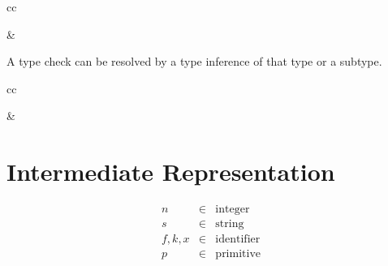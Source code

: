 \documentclass[11pt]{article}
\newcommand{\kw}[1]{\mathtt{#1}}
\begin{document}
\begin{rules}{cc}


&


\end{rules}

A type check can be resolved by a type inference of that type or a subtype.

\begin{rules}{cc}


&


\end{rules}

\newpage

\section{Intermediate Representation}

\newcommand{\appc}[2]{#1\;#2}
\newcommand{\appf}[3]{#1\;#2\;#3}
\newcommand{\letc}[4]{\kw{letc}\;#1\;#2 = #3\;\kw{in}\;#4}

\newcommand{\defterm}[4]{#1\;#2\;#3 = #4}
\newcommand{\letf}[2]{\kw{letf}\;\repo{#1}\;\kw{in}\;#2}
\newcommand{\letff}[2]{\kw{letf}\;#1\;\kw{in}\;#2}

\newcommand{\letv}[3]{\kw{letv}\;#1 = #2\;\kw{in}\;#3}

\newcommand{\funv}[3]{\kw{fun}\;#1\;#2\;.\;#3}
\newcommand{\intv}[1]{#1}
\newcommand{\prmv}[2]{#1(#2)}
\newcommand{\rowv}[2]{\{ \repo{#1 = #2} \}}
\newcommand{\rowvs}[2]{\{ #1 \}}
\newcommand{\strv}[1]{#1}

\newcommand{\andv}[2]{\kw{concat}\;#1\;#2}
\newcommand{\argv}[1]{\kw{argument}\;#1}
\newcommand{\capv}[2]{\kw{capability}\;#1\;#2}
\newcommand{\selv}[2]{\kw{select}\;#1\;#2}

\[
\begin{array}{lcl}
n & \in & \text{integer} \\
s & \in & \text{string} \\
f, k, x & \in & \text{identifier} \\
p & \in & \text{primitive} \\
\end{array}
\]
\end{document}
